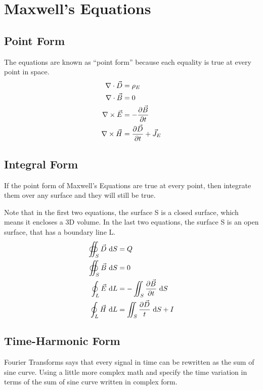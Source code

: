 \documentclass{article}
\begin{document}
	\section{Maxwell's Equations}
	
	\subsection{Point Form}
	The equations are known as ``point form'' because each equality is true at every point in space.
	\begin{align*}
		\opDivergence \ElectricFluxDensity & = \ElectricChargeDensity
		\\
		\opDivergence \MagneticFluxDensity & = 0
		\\
		\opCurl \ElectricField & = - \frac{\partial \MagneticFluxDensity}{\partial \Time}
		\\
		\opCurl \MagneticField & = \frac{\partial \ElectricFluxDensity}{\partial \Time} + \ElectricCurrentDensity
	\end{align*}
	
	\subsection{Integral Form}
	If the point form of Maxwell's Equations are true at every point, then integrate them over any surface and they will still be true.
	
	Note that in the first two equations, the surface S is a closed surface, which means it encloses a 3D volume. In the last two equations, the surface S is an open surface, that has a boundary line L.
	\begin{align*}
		\oiint_\Surface \ElectricFluxDensity \d[\Surface] & = \ElectricCharge
		\\
		\oiint_\Surface \MagneticFluxDensity \d[\Surface] & = 0
		\\
		\oint_\Line \ElectricField \d[\Line] & = - \iint_\Surface \frac{\partial \MagneticFluxDensity}{\partial \Time} \d[\Surface]
		\\
		\oint_\Line \MagneticField \d[\Line] & = \iint_\Surface \frac{\partial \ElectricFluxDensity}{\Time} \d[\Surface] + \ElectricCurrent
	\end{align*}
	
	\subsection{Time-Harmonic Form}
	Fourier Transforms says that every signal in time can be rewritten as the sum of sine curve. Using a little more complex math and specify the time variation in terms of the sum of sine curve written in complex form.
	
\end{document}
